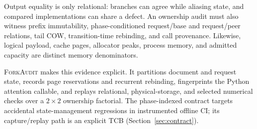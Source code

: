 \documentclass{article}
\newcommand{\method}{\textsc{ForkAudit}}
\begin{document}
Output equality is only relational: branches can agree while aliasing state,
and compared implementations can share a defect.  An ownership audit must also
witness prefix immutability, phase-conditioned request/base and request/peer
relations, tail COW, transition-time rebinding, and call provenance.  Likewise,
logical payload, cache pages, allocator peaks, process memory, and admitted
capacity are distinct memory denominators.

\method{} makes this evidence explicit.  It partitions document and request
state, records page reservations and recurrent rebinding, fingerprints the
Python attention callable, and replays relational, physical-storage, and
selected numerical checks over a $2\times2$ ownership factorial.  The
phase-indexed contract targets accidental state-management regressions in
instrumented offline CI; its capture/replay path is an explicit TCB
(Section~\ref{sec:contract}).
\end{document}
